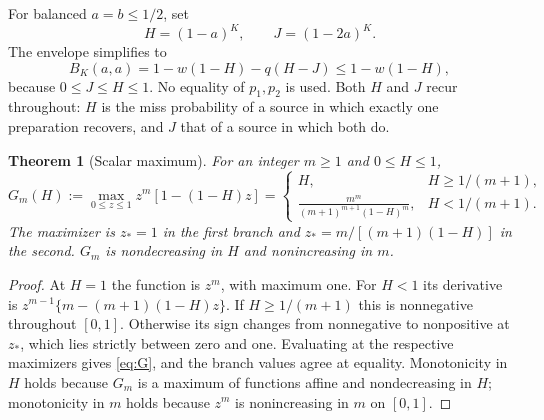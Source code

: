 \documentclass[11pt]{article}
\newtheorem{theorem}{Theorem}[section]
\theoremstyle{remark}\newtheorem{remark}[theorem]{Remark}
\begin{document}
For balanced $a=b\le1/2$, set
\begin{equation}\label{eq:HJ}
H=(1-a)^K,\qquad J=(1-2a)^K .
\end{equation}
The envelope simplifies to
\begin{equation}\label{eq:reduction}
B_K(a,a)=1-w(1-H)-q(H-J)\le1-w(1-H),
\end{equation}
because $0\le J\le H\le1$. No equality of $p_1,p_2$ is used. Both $H$ and $J$
recur throughout: $H$ is the miss probability of a source in which exactly one
preparation recovers, and $J$ that of a source in which both do.

\begin{theorem}[Scalar maximum]\label{thm:scalar}
For an integer $m\ge1$ and $0\le H\le1$,
\begin{equation}\label{eq:G}
G_m(H):=\max_{0\le z\le1}z^m[1-(1-H)z]
=\begin{cases}
H,& H\ge1/(m+1),\\[2pt]
\displaystyle\frac{m^m}{(m+1)^{m+1}(1-H)^m},&H<1/(m+1).
\end{cases}
\end{equation}
The maximizer is $z_*=1$ in the first branch and $z_*=m/[(m+1)(1-H)]$ in the
second. $G_m$ is nondecreasing in $H$ and nonincreasing in $m$.
\end{theorem}
\begin{proof}
At $H=1$ the function is $z^m$, with maximum one. For $H<1$ its derivative is
$z^{m-1}\{m-(m+1)(1-H)z\}$. If $H\ge1/(m+1)$ this is nonnegative throughout
$[0,1]$. Otherwise its sign changes from nonnegative to nonpositive at $z_*$,
which lies strictly between zero and one. Evaluating at the respective
maximizers gives \eqref{eq:G}, and the branch values agree at equality.
Monotonicity in $H$ holds because $G_m$ is a maximum of functions affine and
nondecreasing in $H$; monotonicity in $m$ holds because $z^m$ is nonincreasing in
$m$ on $[0,1]$.
\end{proof}
\end{document}
